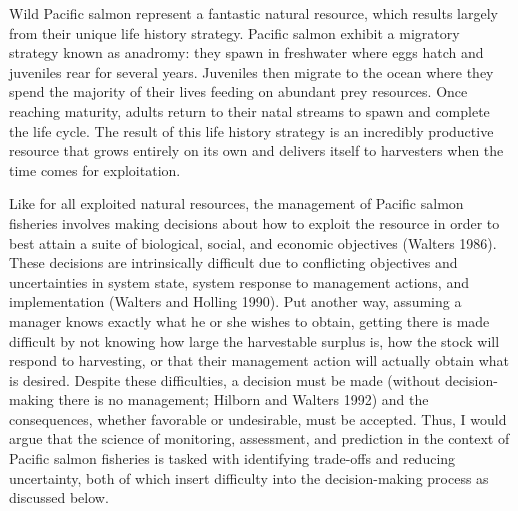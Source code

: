 \documentclass[12pt,]{book}
\theoremstyle{definition}
\theoremstyle{definition}
\theoremstyle{definition}
\theoremstyle{remark}
\begin{document}
Wild Pacific salmon represent a fantastic natural resource, which
results largely from their unique life history strategy. Pacific salmon
exhibit a migratory strategy known as anadromy: they spawn in freshwater
where eggs hatch and juveniles rear for several years. Juveniles then
migrate to the ocean where they spend the majority of their lives
feeding on abundant prey resources. Once reaching maturity, adults
return to their natal streams to spawn and complete the life cycle. The
result of this life history strategy is an incredibly productive
resource that grows entirely on its own and delivers itself to
harvesters when the time comes for exploitation.

Like for all exploited natural resources, the management of Pacific
salmon fisheries involves making decisions about how to exploit the
resource in order to best attain a suite of biological, social, and
economic objectives (Walters 1986). These decisions are intrinsically
difficult due to conflicting objectives and uncertainties in system
state, system response to management actions, and implementation
(Walters and Holling 1990). Put another way, assuming a manager knows
exactly what he or she wishes to obtain, getting there is made difficult
by not knowing how large the harvestable surplus is, how the stock will
respond to harvesting, or that their management action will actually
obtain what is desired. Despite these difficulties, a decision must be
made (without decision-making there is no management; Hilborn and
Walters 1992) and the consequences, whether favorable or undesirable,
must be accepted. Thus, I would argue that the science of monitoring,
assessment, and prediction in the context of Pacific salmon fisheries is
tasked with identifying trade-offs and reducing uncertainty, both of
which insert difficulty into the decision-making process as discussed
below.
\end{document}
